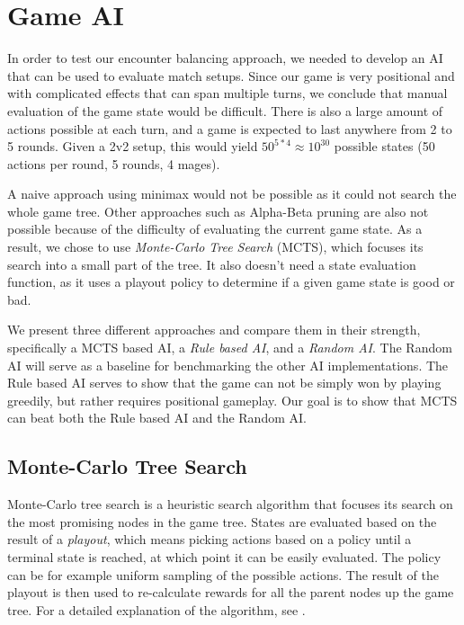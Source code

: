 \chapter{Game AI}
\label{chapter03}

In order to test our encounter balancing approach, we needed to develop an
AI that can be used to evaluate match setups. Since our game is very
positional and with complicated effects that can span multiple turns, we
conclude that manual evaluation of the game state would be difficult.
There is also a large amount of actions possible at each turn, and a game is expected
to last anywhere from 2 to 5 rounds. Given a 2v2 setup, this would yield
$50^{5*4} \approx 10^{30}$ possible states (50 actions per round, 5 rounds, 4 mages).

A naive approach using minimax \citep{ai-modern} would not be possible as it could not search the whole game tree.
Other approaches such as Alpha-Beta pruning \citep{ai-modern} are also not possible because of
the difficulty of evaluating the current game state. As a result, we chose to use \emph{Monte-Carlo Tree Search} (MCTS),
which focuses its search into a small part of the tree. It also doesn't need a state evaluation function,
as it uses a playout policy to determine if a given game state is good or bad.

We present three different approaches and compare them in their strength,
specifically a MCTS based AI, a \emph{Rule based AI}, and a \emph{Random AI}. The Random AI will serve
as a baseline for benchmarking the other AI implementations. The Rule based AI serves to show that the game
can not be simply won by playing greedily, but rather requires positional gameplay. Our goal is to show
that MCTS can beat both the Rule based AI and the Random AI.

\section{Monte-Carlo Tree Search}

Monte-Carlo tree search is a heuristic search algorithm that focuses its search on the most
promising nodes in the game tree. States are evaluated based on the result of a \emph{playout}, which
means picking actions based on a policy until a terminal state is reached, at which point it can be easily
evaluated. The policy can be for example uniform sampling of the possible actions. The result
of the playout is then used to re-calculate rewards for all the parent nodes up the game tree. For a detailed explanation
of the algorithm, see \citep{mcts-survey}.

